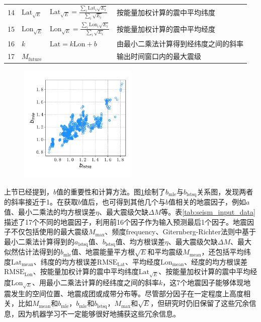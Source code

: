 \begin{table}
\begin{tabular}{llll}
    14 & $\text{Lat}_{\sqrt{E}}$ & $\displaystyle \text{Lat}_{\sqrt{E}}=\frac{\sum_i{\text{Lat}_i\sqrt{E_i}}}{\sum_i{\sqrt{E_i}}}$ & 按能量加权计算的震中平均纬度 \\ 
    15 & $\text{Lon}_{\sqrt{E}}$ & $\displaystyle \text{Lon}_{\sqrt{E}}=\frac{\sum_i{\text{Lon}_i\sqrt{E_i}}}{\sum_i{\sqrt{E_i}}}$ & 按能量加权计算的震中平均经度 \\ 
    16 & $k$ & $\text{Lat}=k\text{Lon}+b$ & 由最小二乘法计算得到经纬度之间的斜率 \\
    17 & $M_{\text{future}}$ & & 输出时间窗口内的最大震级 \\
    \bottomrule
  \end{tabular} 
\end{table}

\begin{figure}[!htbp]
  \centering
  \includegraphics[width=0.50\textwidth]{Img/chap5_seism/seism_b_lstsq_mle_1932_2021.pdf}
  \vspace{-0.5cm}
  \label{fig:seism_b_lstsq_mle_1932_2021}
\end{figure}

上节已经提到，$b$值的重要性和计算方法。图\ref{fig:seism_b_lstsq_mle_1932_2021}绘制了$b_\text{mle}$与$b_\text{lstsq}$关系图，发现两者的斜率接近于1。在获取$b$值后，也可得到其他几个与$b$值相关的地震因子，例如$a$值、最小二乘法的均方根误差$\eta$、最大震级欠缺$\Delta M$等。表\ref{tab:seism_input_data}描述了17个不同的地震因子，利用前16个因子作为输入预测最后1个因子。地震因子不仅包括\citet{Panakkat2007Neural}使用的最大震级$M_{\max}$、频度$\text{frequency}$、Giternberg-Richter法则中基于最小二乘法计算得到的$a_{\text{lstsq}}$值、$b_{\text{lstsq}}$值、均方根误差$\eta$、最大震级欠缺$\Delta M$、最大似然估计法得到的$b_{\text{mle}}$值、地震能量平方根$\sqrt{E}$和平均震级$M_{\text{mean}}$，还包括平均纬度$\text{Lat}_{\text{mean}}$、纬度的均方根误差$\text{RMSE}_{\text{Lat}}$、平均经度$\text{Lon}_{\text{mean}}$、经度的均方根误差$\text{RMSE}_{\text{Lon}}$、按能量加权计算的震中平均纬度$\text{Lat}_{\sqrt{E}}$、按能量加权计算的震中平均经度$\text{Lon}_{\sqrt{E}}$、用最小二乘法计算的经纬度之间的斜率$k$，这7个地震因子能够体现地震发生的空间位置、地震成团或成带分布等。尽管部分因子在一定程度上高度相关，比如$M_{\text{mean}}$和$b_{\text{mle}}$，$b_{\text{mle}}$和$b_{\text{lstsq}}$，$M_{\max}$和$\sqrt{E}$，但研究时仍旧保留了这些冗余信息，因为机器学习不一定能够很好地捕获这些冗余信息。


